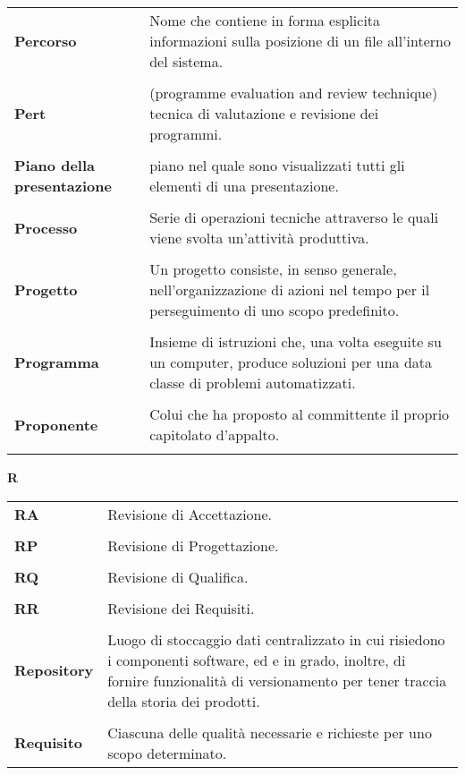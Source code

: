 {\begin{longtable}{L{4cm} p{10cm}}
 \\ 
\textbf{Percorso} & Nome che contiene in forma esplicita informazioni sulla posizione di un file all'interno del sistema. \\ 
 \\ 
\textbf{Pert} & (programme evaluation and review technique) tecnica di valutazione e revisione dei programmi. \\ 
 \\ 
\textbf{Piano della presentazione} & piano nel quale sono visualizzati tutti gli elementi di una presentazione. \\ 
 \\ 
\textbf{Processo} & Serie di operazioni tecniche attraverso le quali viene svolta un'attività produttiva. \\ 
 \\ 
\textbf{Progetto} & Un progetto consiste, in senso generale, nell'organizzazione di azioni nel tempo per il perseguimento di uno scopo predefinito. \\ 
 \\ 
\textbf{Programma} & Insieme di istruzioni che, una volta eseguite su un computer, produce soluzioni per una data classe di problemi automatizzati. \\ 
 \\ 
\textbf{Proponente} & Colui che ha proposto al committente il proprio capitolato d’appalto. \\ 
 \\ 
\end{longtable} 
\newpage 
{} 
{} 
\hfill\Huge{\textbf{R}} \\ 
\normalsize 
\begin{longtable}{L{4cm} p{10cm}}
\textbf{RA} & Revisione di Accettazione. \\ 
 \\ 
\textbf{RP} & Revisione di Progettazione. \\ 
 \\ 
\textbf{RQ} & Revisione di Qualifica. \\ 
 \\ 
\textbf{RR} & Revisione dei Requisiti. \\ 
 \\ 
\textbf{Repository} & Luogo di stoccaggio dati centralizzato in cui risiedono i componenti software, ed e in grado, inoltre, di fornire funzionalità di versionamento per tener traccia della storia dei prodotti. \\ 
 \\ 
\textbf{Requisito} & Ciascuna delle qualità necessarie e richieste per uno scopo determinato. \\ 

\end{longtable}}
